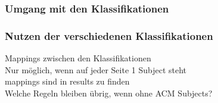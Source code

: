 \documentclass[12pt, xcolor=table]{beamer}
\begin{document}
\begin{frame}
	\frametitle{Umgang mit den Klassifikationen}
\end{frame}
\begin{frame}
	\frametitle{Nutzen der verschiedenen Klassifikationen}
    Mappings zwischen den Klassifikationen\\
    Nur möglich, wenn auf jeder Seite 1 Subject steht\\
    mappings sind in results zu finden\\
    Welche Regeln bleiben übrig, wenn ohne ACM Subjects?
\end{frame}
\end{document}
